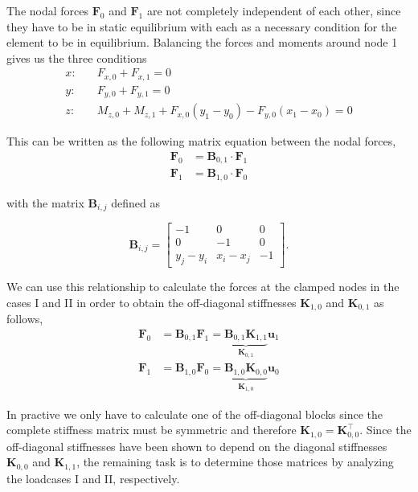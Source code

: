 The nodal forces $\boldsymbol{F}_0$ and $\boldsymbol{F}_1$ are not completely independent of each other, since they have to be in static equilibrium with each as a necessary condition for the element to be in equilibrium.
Balancing the forces and moments around node 1 gives us the three conditions
%
\begin{align}
x:\quad &F_{x,0} + F_{x,1} = 0 \\
y:\quad &F_{y,0} + F_{y,1} = 0 \\
z:\quad &M_{z,0} + M_{z,1} + F_{x,0}(y_1 - y_0) - F_{y,0}(x_1 - x_0) = 0
\end{align}

This can be written as the following matrix equation between the nodal forces,
%
\begin{align}
\boldsymbol{F}_0 &= \boldsymbol{B}_{0,1}\cdot\boldsymbol{F}_1 \\
\boldsymbol{F}_1 &= \boldsymbol{B}_{1,0}\cdot\boldsymbol{F}_0
\end{align}

with the matrix $\boldsymbol{B}_{i,j}$ defined as

\begin{equation}
\boldsymbol{B}_{i,j} = \begin{bmatrix}
-1 & 0 & 0 \\
0 & -1 & 0 \\
y_j - y_i & x_i - x_j & -1
\end{bmatrix}.
\end{equation}

We can use this relationship to calculate the forces at the clamped nodes in the cases I and II in order to obtain the off-diagonal stiffnesses $\boldsymbol{K}_{1,0}$ and $\boldsymbol{K}_{0,1}$ as follows,
%
\begin{align}
\boldsymbol{F}_0 &= \boldsymbol{B}_{0,1}\boldsymbol{F}_1 = \underbrace{\boldsymbol{B}_{0,1}\boldsymbol{K}_{1,1}}_{\boldsymbol{K}_{0,1}}\boldsymbol{u}_1 \\
\boldsymbol{F}_1 &= \boldsymbol{B}_{1,0}\boldsymbol{F}_0 = \underbrace{\boldsymbol{B}_{1,0}\boldsymbol{K}_{0,0}}_{\boldsymbol{K}_{1,0}}\boldsymbol{u}_0
\end{align}

In practive we only have to calculate one of the off-diagonal blocks since the complete stiffness matrix must be symmetric and therefore $\boldsymbol{K}_{1,0} = \boldsymbol{K}_{0,0}^\intercal$.
Since the off-diagonal stiffnesses have been shown to depend on the diagonal stiffnesses $\boldsymbol{K}_{0,0}$ and $\boldsymbol{K}_{1,1}$, the remaining task is to determine those matrices by analyzing the loadcases I and II, respectively.

